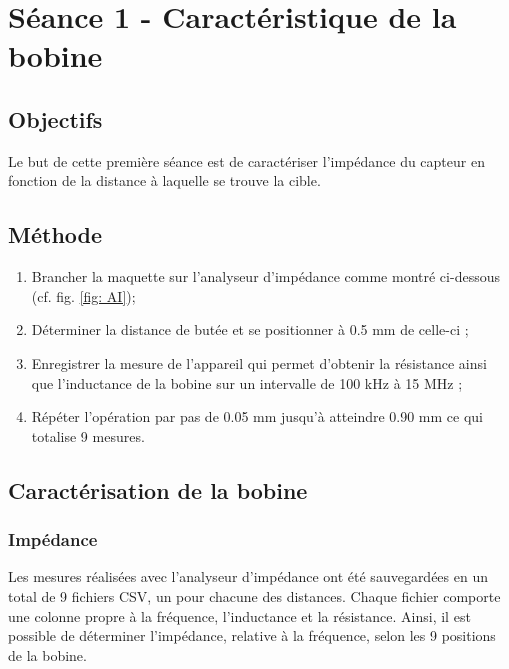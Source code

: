 

\section{Séance 1 - Caractéristique de la bobine }

\subsection{Objectifs}

Le but de cette première séance est de caractériser l'impédance du capteur en fonction de la distance
à laquelle se trouve la cible.


\subsection{Méthode}

\begin{enumerate}
    \item Brancher la maquette sur l'analyseur d'impédance comme montré ci-dessous (cf. fig. \ref{fig: AI});
    \item Déterminer la distance de butée et se positionner à 0.5 mm de celle-ci ;
    \item Enregistrer la mesure de l'appareil qui permet d'obtenir la résistance ainsi que l'inductance de 
    la bobine sur un intervalle de 100 kHz à 15 MHz ;
    \item Répéter l'opération par pas de 0.05 mm jusqu'à atteindre 0.90 mm ce qui totalise 9 mesures.
\end{enumerate} 


\subsection{Caractérisation de la bobine}

\subsubsection{Impédance}


Les mesures réalisées avec l'analyseur d'impédance ont été sauvegardées en un total
de 9 fichiers CSV, un pour chacune des distances. Chaque fichier comporte une colonne propre à
la fréquence, l'inductance et la résistance. Ainsi, il est possible de déterminer l'impédance, relative
à la fréquence, selon les 9 positions de la bobine.\\


